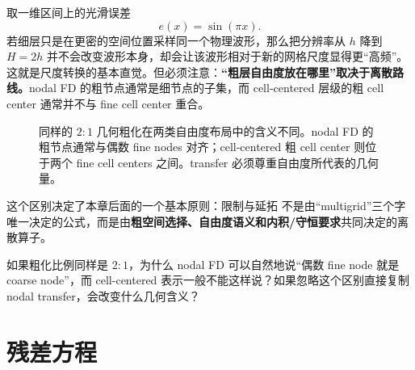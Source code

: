取一维区间上的光滑误差
\begin{equation}
e(x)=\sin(\pi x).
\end{equation}
若细层只是在更密的空间位置采样同一个物理波形，那么把分辨率从 $h$ 降到 $H=2h$ 并不会改变波形本身，却会让该波形相对于新的网格尺度显得更“高频”。这就是尺度转换的基本直觉。但必须注意：\textbf{“粗层自由度放在哪里”取决于离散路线。}nodal FD 的粗节点通常是细节点的子集，而 cell-centered 层级的粗 cell center 通常并不与 fine cell center 重合。

\begin{figure}[htbp]
\centering
{}
\caption{同样的 $2{:}1$ 几何粗化在两类自由度布局中的含义不同。nodal FD 的粗节点通常与偶数 fine nodes 对齐；cell-centered 粗 cell center 则位于两个 fine cell centers 之间。transfer 必须尊重自由度所代表的几何量。}
\label{fig:twogrid-nodal-cell-centered-layout}
\end{figure}

这个区别决定了本章后面的一个基本原则：限制与延拓 不是由“multigrid”三个字唯一决定的公式，而是由\textbf{粗空间选择、自由度语义和内积/守恒要求}共同决定的离散算子。

\begin{checkpointbox}
如果粗化比例同样是 $2{:}1$，为什么 nodal FD 可以自然地说“偶数 fine node 就是 coarse node”，而 cell-centered 表示一般不能这样说？如果忽略这个区别直接复制 nodal transfer，会改变什么几何含义？
\end{checkpointbox}

\section{残差方程}

